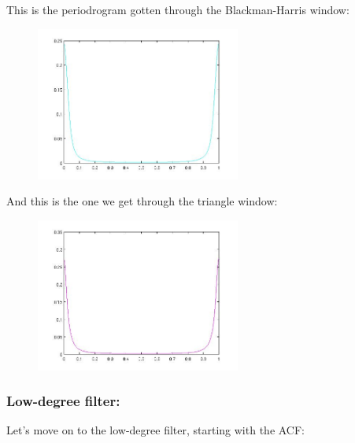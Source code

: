 \documentclass[a4paper,11pt]{article}
\begin{document}
\newpage

This is the periodrogram gotten through the Blackman-Harris window:

\begin{figure}[!hp]
    \begin{center}
    \includegraphics[width=0.6\textwidth]{images/lab2_redo_figure6.jpg}
    \end{center}
\end{figure}

And this is the one we get through the triangle window:

\begin{figure}[!hp]
    \begin{center}
    \includegraphics[width=0.6\textwidth]{images/lab2_redo_figure7.jpg}
    \end{center}
\end{figure}

\newpage

\subsubsection{Low-degree filter:}

Let's move on to the low-degree filter, starting with the ACF:
\end{document}
